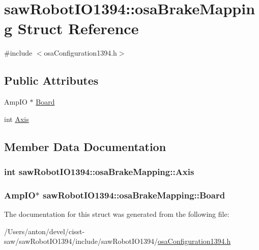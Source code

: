 \hypertarget{structsaw_robot_i_o1394_1_1osa_brake_mapping}{}\section{saw\+Robot\+I\+O1394\+:\+:osa\+Brake\+Mapping Struct Reference}
\label{structsaw_robot_i_o1394_1_1osa_brake_mapping}


{\ttfamily \#include $<$osa\+Configuration1394.\+h$>$}

\subsection*{Public Attributes}
\begin{DoxyCompactItemize}
\item 
Amp\+I\+O $\ast$ \hyperlink{structsaw_robot_i_o1394_1_1osa_brake_mapping_ac02e89eb743ac2c68da3ac7414a4b522}{Board}
\item 
int \hyperlink{structsaw_robot_i_o1394_1_1osa_brake_mapping_a9dfdbcd06b84554c4b2000789d62e489}{Axis}
\end{DoxyCompactItemize}


\subsection{Member Data Documentation}
\hypertarget{structsaw_robot_i_o1394_1_1osa_brake_mapping_a9dfdbcd06b84554c4b2000789d62e489}{}
\subsubsection[{Axis}]{\setlength{\rightskip}{0pt plus 5cm}int saw\+Robot\+I\+O1394\+::osa\+Brake\+Mapping\+::\+Axis}\label{structsaw_robot_i_o1394_1_1osa_brake_mapping_a9dfdbcd06b84554c4b2000789d62e489}
\hypertarget{structsaw_robot_i_o1394_1_1osa_brake_mapping_ac02e89eb743ac2c68da3ac7414a4b522}{}
\subsubsection[{Board}]{\setlength{\rightskip}{0pt plus 5cm}Amp\+I\+O$\ast$ saw\+Robot\+I\+O1394\+::osa\+Brake\+Mapping\+::\+Board}\label{structsaw_robot_i_o1394_1_1osa_brake_mapping_ac02e89eb743ac2c68da3ac7414a4b522}


The documentation for this struct was generated from the following file\+:\begin{DoxyCompactItemize}
\item 
/\+Users/anton/devel/cisst-\/saw/saw\+Robot\+I\+O1394/include/saw\+Robot\+I\+O1394/\hyperlink{osa_configuration1394_8h}{osa\+Configuration1394.\+h}\end{DoxyCompactItemize}
